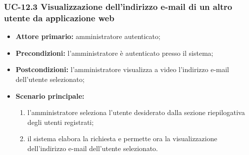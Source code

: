 \subsubsection{UC-12.3 Visualizzazione dell'indirizzo e-mail di un altro utente da applicazione web}
\begin{itemize}
	\item \textbf{Attore primario:} amministratore autenticato;

	\item \textbf{Precondizioni:} l'amministratore è autenticato presso il sistema;

	\item \textbf{Postcondizioni:} l'amministratore visualizza a video l'indirizzo e-mail dell'utente selezionato;

	\item \textbf{Scenario principale:}
		\begin{enumerate}
   			 \item  l'amministratore seleziona l'utente desiderato dalla sezione riepilogativa degli utenti registrati;
   			 \item  il sistema elabora la richiesta e permette ora la visualizzazione dell'indirizzo e-mail dell'utente selezionato.
		\end{enumerate}
\end{itemize}


